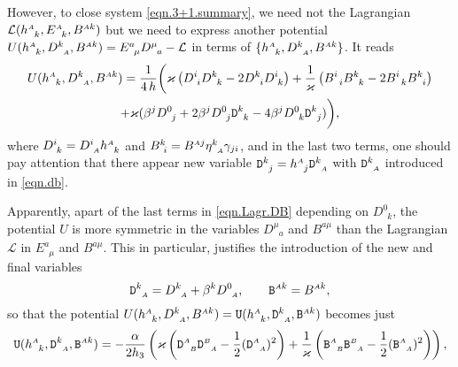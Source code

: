 \documentclass[
10pt, %
a4paper, %
oneside, %
headinclude,footinclude, %
BCOR5mm, %
]{scrartcl}
\newcommand{\sA}{\mathsmaller A}
\newcommand{\sB}{\mathsmaller B}
\newcommand{\tetrsymbol}{h}
\newcommand{\itetrsymbol}{\eta}
\newcommand{\itetr}[2]{\itetrsymbol^{#1}_{\phantom{#1}#2}}
\newcommand{\tetr}[2]{\tetrsymbol^{#1}_{\phantom{#1}#2}}
\newcommand{\detTetr}{\tetrsymbol}
\newcommand{\ET}[2]{E^{#1}_{\phantom{#1}#2}}	%
\newcommand{\Dm}[2]{D_{\phantom{#2}#1}^{#2}}	%
\newcommand{\Dfin}[2]{\mathtt{D}_{\phantom{#2}#1}^{#2}}	%
\newcommand{\Ufin}{\mathtt{U}}
\newcommand{\BT}[2]{B^{#1#2}}	%
\newcommand{\Bmmix}[2]{B^{#1}_{#2}}	%
\newcommand{\Bm}[2]{B^{#1#2}}	%
\newcommand{\Bfin}[2]{\mathtt{B}^{#1#2}}	%
\newcommand{\Bfinmix}[2]{\mathtt{B}^{#1}_{\phantom{#1}#2}}	%
\newcommand{\LagBE}{\mathcal{L}}%
\newcommand{\Um}{U}%
\begin{document}
However, to close system \eqref{eqn.3+1.summary}, we need not the Lagrangian $ 
\LagBE(\tetr{\sA}{k},\ET{\sA}{k},\BT{\sA}{k}) $ but we need to express another 
potential $ \Um(\tetr{\sA}{k},\Dm{\sA}{k},\Bm{\sA}{k}) = \ET{a}{\mu} 
\Dm{a}{\mu} - \LagBE$
in terms of $ \{\tetr{\sA}{k},\Dm{\sA}{k},\Bm{\sA}{k}\} $. It reads
\begin{multline}\label{eqn.Lagr.DB}
	\Um(\tetr{\sA}{k},\Dm{\sA}{k},\Bm{\sA}{k}) = 
	\frac{1}{4\,h} \bigg( \varkappa \left(
	\Dm{i}{i}\Dm{k}{k} - 2 \Dm{i}{k}\Dm{k}{i}
	\right)
	+ \frac{1}{\varkappa} \left ( 
	\Bmmix{i}{\ \,i}\Bmmix{k}{\ \,k}
	- 2 \Bmmix{i}{\ \,k}\Bmmix{k}{\ \,i}
	\right ) \\
	+ \varkappa (\beta^j \Dm{j}{0} + 2 \beta^j \Dm{j}{0}\Dfin{k}{k} - 4 \beta^j \Dm{k}{0} 
	\Dfin{j}{k}) 
	\bigg),
\end{multline}
where $ \Dm{k}{i} = \Dm{\sA}{i} \tetr{\sA}{k} $ and $ \Bmmix{k}{\ i} = \Bm{\sA}{j} \itetr{k}{\sA} 
\gamma_{ji} $, and in the last two terms, one should pay attention that there appear new variable 
$ \Dfin{j}{k} = \tetr{\sA}{j} \Dfin{\sA}{k}$ with $ \Dfin{\sA}{k} $ introduced in \eqref{eqn.db}.

Apparently, apart of the last terms in \eqref{eqn.Lagr.DB} depending on $ \Dm{k}{0} $, the potential 
$ \Um $ is more symmetric in the variables $ \Dm{a}{\mu} $ and $ 
\Bm{a}{\mu} $ than the Lagrangian $ \LagBE $ in $ \ET{a}{\mu} $ and $ \BT{a}{\mu} $. This in 
particular, justifies the introduction of the new and final variables 
\begin{equation}\label{eqn.db}
	\Dfin{\sA}{k} = \Dm{\sA}{k} + \beta^k \Dm{\sA}{0}, \qquad \Bfin{\sA}{k} = \Bm{\sA}{k},
\end{equation}
so that the potential $ \Um(\tetr{\sA}{k},\Dm{\sA}{k},\Bm{\sA}{k}) = 
\Ufin(\tetr{\sA}{k},\Dfin{\sA}{k},\Bfin{\sA}{k})$ becomes just
	\begin{equation}\label{eqn.Ufin}
		\Ufin(\tetr{\sA}{k},\Dfin{\sA}{k},\Bfin{\sA}{k}) = 
		-\frac{\alpha}{2\detTetr_3} \left( 
		\varkappa \left( \Dfin{\sB}{\sA} \Dfin{\sA}{\sB} - \frac{1}{2} (\Dfin{\sA}{\sA})^2\right)
		+
		\frac{1}{\varkappa} \left( \Bfinmix{\sA}{\sB} \Bfinmix{\sB}{\sA} - \frac{1}{2} 
		(\Bfinmix{\sA}{\sA})^2
		\right)
		\right),
	\end{equation}
\end{document}
